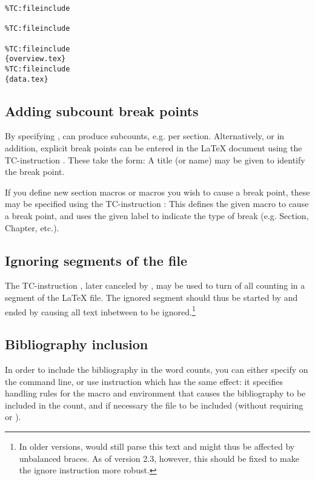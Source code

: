 \documentclass{article}
\begin{document}
\begin{lstlisting}
%TC:fileinclude 

%TC:fileinclude 

%TC:fileinclude 
{overview.tex}
%TC:fileinclude 
{data.tex}
\end{lstlisting}


\subsection{Adding subcount break points}

By specifying , \TeXcount{} can produce subcounts, e.g. per section. Alternatively, or in addition, explicit break points can be entered in the \LaTeX{} document using the TC-instruction . These take the form:
A title (or name) may be given to identify the break point.

If you define new section macros or macros you wish to cause a break point, these may be specified using the TC-instruction :
This defines the given macro to cause a break point, and uses the given label to indicate the type of break (e.g. Section, Chapter, etc.).


\subsection{Ignoring segments of the file}

The TC-instruction , later canceled by , may be used to turn of all counting in a segment of the \LaTeX{} file. The ignored segment should thus be started by
and ended by
causing all text inbetween to be ignored.\footnote{In older versions, \TeXcount{} would still parse this text and might thus be affected by unbalanced braces. As of version 2.3, however, this should be fixed to make the ignore instruction more robust.}


\subsection{Bibliography inclusion}

In order to include the bibliography in the word counts, you can either specify  on the command line, or use \TeXcount{} instruction
which has the same effect: it specifies handling rules for the  macro and  environment that causes the bibliography to be included in the count, and if necessary the  file to be included (without requiring  or ).
\end{document}
